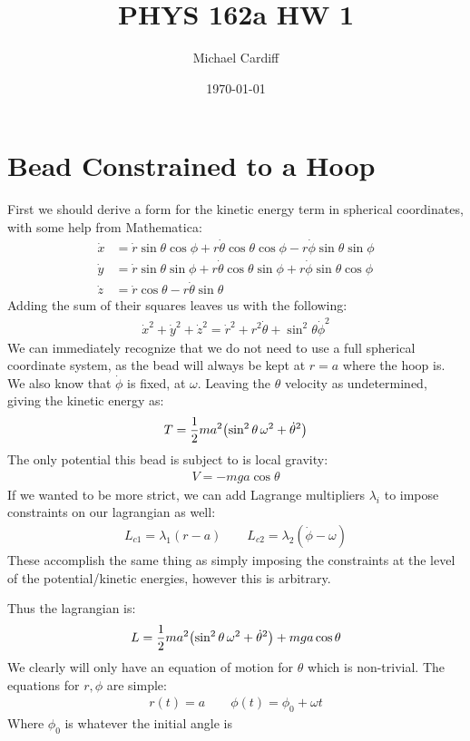 \documentclass[12pt]{article}
\title{\vspace{-3em}PHYS 162a HW 1}
\author{Michael Cardiff}
\date{\today}
\begin{document}
\maketitle

\section{Bead Constrained to a Hoop}
First we should derive a form for the kinetic energy term in spherical coordinates, with some help from Mathematica:
\begin{align*}
  \dot{x}&=\dot{r}\sin\theta\cos\phi
  +r\dot\theta\cos\theta\cos\phi
  -r\dot\phi\sin\theta\sin\phi\\
  \dot{y}&=\dot{r}\sin\theta\sin\phi
  +r\dot\theta\cos\theta\sin\phi
  +r\dot\phi\sin\theta\cos\phi\\
  \dot{z}&=\dot{r}\cos\theta-r\dot\theta\sin\theta
\end{align*}
Adding the sum of their squares leaves us with the following:
\begin{align*}
  \dot{x}^2+\dot{y}^2+\dot{z}^2=\dot{r}^2+r^2\dot\theta+\sin^2\theta\dot\phi^2
\end{align*}
We can immediately recognize that we do not need to use a full spherical coordinate system, as the bead will always be kept at $r=a$ where the hoop is. We also know that $\dot{\phi}$ is fixed, at $\omega$. Leaving the $\theta$ velocity as undetermined, giving the kinetic energy as:
\begin{align*}
  T=\frac12ma^2\qty(\sin^2\theta\,\omega^2+\dot{\theta}^2)
\end{align*}
The only potential this bead is subject to is local gravity:
\begin{align*}
  V=-mga\cos\theta
\end{align*}
If we wanted to be more strict, we can add Lagrange multipliers $\lambda_i$ to impose constraints on our lagrangian as well:
\begin{align*}
  L_{c1}=\lambda_1(r-a)\qquad L_{c2}=\lambda_2(\dot{\phi}-\omega)
\end{align*}
These accomplish the same thing as simply imposing the constraints at the level of the potential/kinetic energies, however this is arbitrary.

Thus the lagrangian is:
\begin{align*}
  L=\frac12ma^2\qty(\sin^2\theta\,\omega^2+\dot{\theta}^2)+mga\cos\theta
\end{align*}
We clearly will only have an equation of motion for $\theta$ which is non-trivial. The equations for $r,\phi$ are simple:
\begin{align*}
  r(t)=a\qquad \phi(t)=\phi_0+\omega t
\end{align*}
Where $\phi_0$ is whatever the initial angle is
\end{document}
